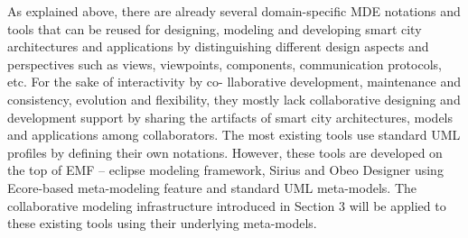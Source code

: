 As explained above, there are already several domain-specific MDE notations and tools that can be reused for designing, modeling and developing smart city architectures and applications by distinguishing different design aspects and perspectives such as views, viewpoints, components, communication protocols, etc. For the sake of interactivity by co- llaborative development, maintenance and consistency, evolution and flexibility, they mostly lack collaborative designing and development support by sharing the artifacts of smart city architectures, models and applications among collaborators. The most existing tools use standard UML profiles by defining their own notations. However, these tools are developed on the top of EMF – eclipse modeling framework, Sirius and Obeo Designer using Ecore-based meta-modeling feature and standard UML meta-models. The collaborative modeling infrastructure introduced in Section 3 will be applied to these existing tools using their underlying meta-models.

